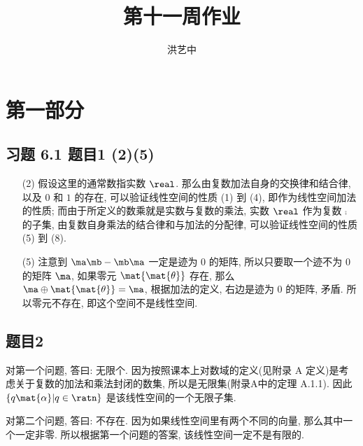 \title{第十一周作业}
\author{洪艺中}
\maketitle
\section{第一部分}
\newcommand{\lvec}[1]{\overrightarrow{#1}}

\subsection*{ 习题 6.1 题目1 (2)(5) }
\begin{solution}
\begin{enumerate}
    \item[(2)] 假设这里的通常数指实数 $\real$. 那么由复数加法自身的交换律和结合律, 以及 $0$ 和 $1$ 的存在, 可以验证线性空间的性质 (1) 到 (4), 即作为线性空间加法的性质; 而由于所定义的数乘就是实数与复数的乘法, 实数 $\real$ 作为复数 $\comp$ 的子集, 由复数自身乘法的结合律和与加法的分配律, 可以验证线性空间的性质 (5) 到 (8).
    \item[(5)] 注意到 $\ma \mb - \mb \ma$ 一定是迹为 $0$ 的矩阵, 所以只要取一个迹不为 $0$ 的矩阵 $\ma$, 如果零元 $\mat{\mat{\theta}}$ 存在, 那么 $\ma \oplus \mat{\mat{\theta}} = \ma$, 根据加法的定义, 右边是迹为 $0$ 的矩阵, 矛盾. 所以零元不存在, 即这个空间不是线性空间.
\end{enumerate}
\end{solution}

\subsection*{ 题目2 }
\begin{solution}
对第一个问题, 答曰: 无限个. 因为按照课本上对数域的定义(见附录 A 定义)是考虑关于复数的加法和乘法封闭的数集, 所以是无限集(附录A中的定理 A.1.1). 因此 $\{q \mat{\alpha} | q \in \ratn\}$ 是该线性空间的一个无限子集.

对第二个问题, 答曰: 不存在. 因为如果线性空间里有两个不同的向量, 那么其中一个一定非零. 所以根据第一个问题的答案, 该线性空间一定不是有限的.
\end{solution}

